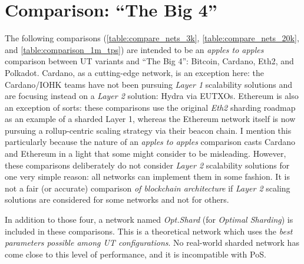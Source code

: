 \clearpage
\section{Comparison: ``The Big 4''}

The following comparisons (\autoref{table:compare_nets_3k}, \autoref{table:compare_nets_20k}, and \autoref{table:comparison_1m_tps}) are intended to be an \emph{apples to apples} comparison between UT variants and ``The Big 4'': Bitcoin, Cardano, Eth2, and Polkadot.
Cardano, as a cutting-edge network, is an exception here: the Cardano/IOHK teams have not been pursuing \emph{Layer 1} scalability solutions and are focusing instead on a \emph{Layer 2} solution: Hydra via EUTXOs.
Ethereum is also an exception of sorts: these comparisons use the original \emph{Eth2} sharding roadmap as an example of a sharded Layer 1, whereas the Ethereum network itself is now pursuing a rollup-centric scaling strategy via their beacon chain.
I mention this particularly because the nature of an \emph{apples to apples} comparison casts Cardano and Ethereum in a light that some might consider to be misleading.
However, these comparisons deliberately do not consider \emph{Layer 2} scalability solutions for one very simple reason: all networks can implement them in some fashion.
It is not a fair (or accurate) comparison \emph{of blockchain architecture} if \emph{Layer 2} scaling solutions are considered for some networks and not for others.

In addition to those four, a network named \emph{Opt.Shard} (for \emph{Optimal Sharding}) is included in these comparisons.
This is a theoretical network which uses the \emph{best parameters possible among UT configurations}.
No real-world sharded network has come close to this level of performance, and it is incompatible with PoS.

